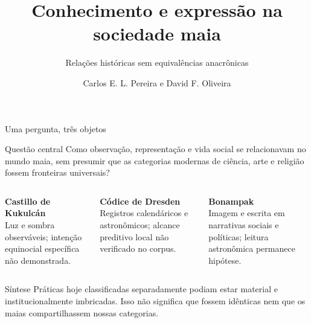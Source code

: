 \documentclass[aspectratio=169]{beamer}
\title{Conhecimento e expressão na sociedade maia}
\subtitle{Relações históricas sem equivalências anacrônicas}
\author{Carlos E. L. Pereira e David F. Oliveira}
\institute{IMPA Tech}
\begin{document}
\begin{frame}[plain]
  \titlepage
\end{frame}

\begin{frame}{Uma pergunta, três objetos}
\begin{block}{Questão central}
Como observação, representação e vida social se relacionavam no mundo maia, sem presumir que as categorias modernas de ciência, arte e religião fossem fronteiras universais?
\end{block}

\vspace{0.2cm}
\begin{columns}[T,onlytextwidth]
  \textbf{Castillo de Kukulcán}\\[0.08cm]
  Luz e sombra observáveis; intenção equinocial específica não demonstrada.

  \textbf{Códice de Dresden}\\[0.08cm]
  Registros calendáricos e astronômicos; alcance preditivo local não verificado no corpus.

  \textbf{Bonampak}\\[0.08cm]
  Imagem e escrita em narrativas sociais e políticas; leitura astronômica permanece hipótese.
\end{columns}

\vfill
\begin{alertblock}{Síntese}
Práticas hoje classificadas separadamente podiam estar material e institucionalmente imbricadas. Isso não significa que fossem idênticas nem que os maias compartilhassem nossas categorias.
\end{alertblock}
\end{frame}
\end{document}

